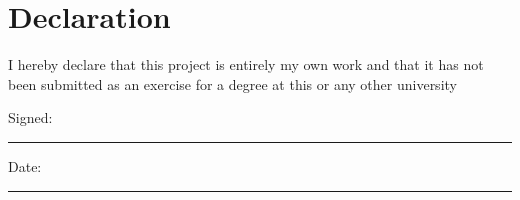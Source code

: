 \section*{\Huge{Declaration}}
\vspace{2.5cm}
I hereby declare that this project is entirely my own work and that it has not been submitted as an exercise for a degree at this or any other university


\vspace{5cm}

Signed:~\rule{5cm}{0.3pt}\hfill Date:~\rule{5cm}{0.3pt}